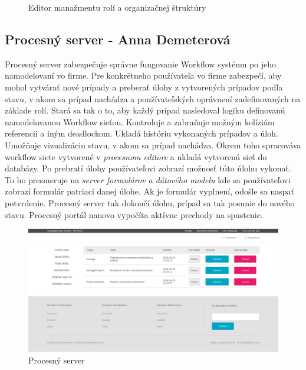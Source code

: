 \begin{figure}[h]
	\centering
	\caption{Editor manažmentu rolí a organizačnej štruktúry}
	\label{fig:Editor manažmentu rolí a organizačnej štruktúry}
\end{figure}


\subsection{Procesný server - Anna Demeterová}
Procesný server zabezpečuje správne fungovanie Workflow systému po jeho namodelovaní vo firme. Pre konkrétneho používateľa vo firme zabezpečí, aby mohol vytvárať nové prípady a preberať úlohy z vytvorených prípadov podľa stavu, v akom sa prípad nachádza a používateľských oprávnení zadefinovaných na základe rolí. Stará sa tak o to, aby každý prípad nasledoval logiku definovanú namodelovanou Workflow sieťou. Kontroluje a zabraňuje možným  kolíziám referencii a iným deadlockom.  
Ukladá históriu vykonaných prípadov a úloh. Umožňuje vizualizáciu stavu, v akom sa prípad nachádza. Okrem toho spracováva workflow siete vytvorené v \emph{procesnom editore} a ukladá vytvorenú sieť do databázy. Po prebratí úlohy používateľovi zobrazí možnosť túto úlohu vykonať. To ho presmeruje na \emph{server formulárov a dátového modelu} kde sa používateľovi zobrazí formulár patriaci danej úlohe. Ak je formulár vyplnení, odošle sa naspať potvrdenie. Procesný server tak dokončí úlohu, prípad sa tak posunie do nového stavu. Procesný portál nanovo vypočíta aktívne prechody na spustenie.

\begin{figure}[h]
	\centering
	\includegraphics[width=1\linewidth]{images/anicka}
	\caption{Procesný server}
	\label{fig:Procesný server}
\end{figure}



